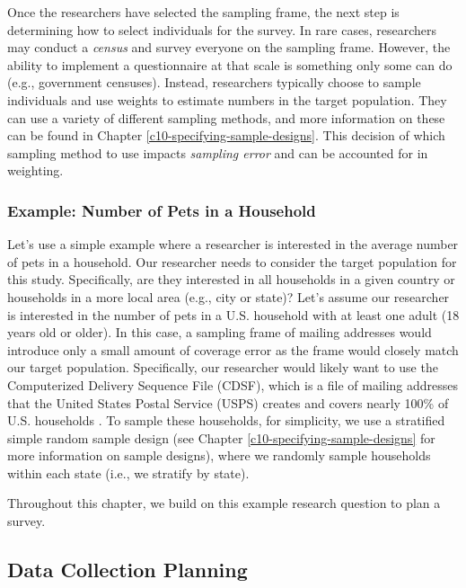 \documentclass[
]{krantz}
\begin{document}
Once the researchers have selected the sampling frame, the next step is determining how to select individuals for the survey. In rare cases, researchers may conduct a \emph{census} and survey everyone on the sampling frame. However, the ability to implement a questionnaire at that scale is something only some can do (e.g., government censuses). Instead, researchers typically choose to sample individuals and use weights to estimate numbers in the target population. They can use a variety of different sampling methods, and more information on these can be found in Chapter \ref{c10-specifying-sample-designs}. This decision of which sampling method to use impacts \emph{sampling error} and can be accounted for in weighting.

\hypertarget{overview-design-sampdesign-ex}{%
\subsubsection*{Example: Number of Pets in a Household}\label{overview-design-sampdesign-ex}}


Let's use a simple example where a researcher is interested in the average number of pets in a household. Our researcher needs to consider the target population for this study. Specifically, are they interested in all households in a given country or households in a more local area (e.g., city or state)? Let's assume our researcher is interested in the number of pets in a U.S. household with at least one adult (18 years old or older). In this case, a sampling frame of mailing addresses would introduce only a small amount of coverage error as the frame would closely match our target population. Specifically, our researcher would likely want to use the Computerized Delivery Sequence File (CDSF), which is a file of mailing addresses that the United States Postal Service (USPS) creates and covers nearly 100\% of U.S. households \citep{harter2016address}. To sample these households, for simplicity, we use a stratified simple random sample design (see Chapter \ref{c10-specifying-sample-designs} for more information on sample designs), where we randomly sample households within each state (i.e., we stratify by state).

Throughout this chapter, we build on this example research question to plan a survey.

\hypertarget{overview-design-dcplanning}{%
\subsection{Data Collection Planning}\label{overview-design-dcplanning}}
\end{document}
